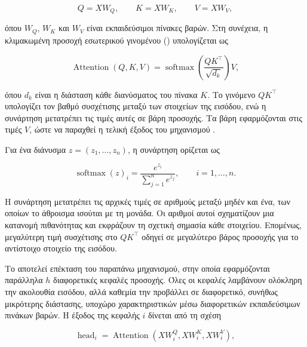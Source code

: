 \begin{equation}
    Q=XW_Q,\qquad K=XW_K,\qquad V=XW_V,
\end{equation}

όπου \(W_Q\), \(W_K\) και \(W_V\) είναι εκπαιδεύσιμοι πίνακες βαρών. Στη
συνέχεια, η κλιμακωμένη προσοχή εσωτερικού γινομένου
() υπολογίζεται ως

\begin{equation}
    \operatorname{Attention}(Q,K,V)
    =
    \operatorname{softmax}
    \left(
        \frac{QK^{\top}}{\sqrt{d_k}}
    \right)V,
    \label{eq:attention}
\end{equation}

όπου \(d_k\) είναι η διάσταση κάθε διανύσματος του πίνακα \(K\). Το γινόμενο
\(QK^{\top}\) υπολογίζει τον βαθμό συσχέτισης μεταξύ των στοιχείων της
εισόδου, ενώ η συνάρτηση  μετατρέπει τις τιμές αυτές σε βάρη
προσοχής. Τα βάρη εφαρμόζονται στις τιμές \(V\), ώστε να παραχθεί η τελική
έξοδος του μηχανισμού \cite{vaswani2017attention}.

Για ένα διάνυσμα \(z=(z_1,\ldots,z_n)\), η συνάρτηση  ορίζεται ως

\begin{equation}
    \operatorname{softmax}(z)_i
    =
    \frac{e^{z_i}}{\sum_{j=1}^{n}e^{z_j}},
    \qquad i=1,\ldots,n.
    \label{eq:softmax}
\end{equation}

Η συνάρτηση  μετατρέπει τις αρχικές τιμές σε αριθμούς μεταξύ
μηδέν και ένα, των οποίων το άθροισμα ισούται με τη μονάδα. Οι αριθμοί αυτοί
σχηματίζουν μια κατανομή πιθανότητας και εκφράζουν τη σχετική σημασία κάθε
στοιχείου. Επομένως, μεγαλύτερη τιμή συσχέτισης στο \(QK^{\top}\) οδηγεί σε
μεγαλύτερο βάρος προσοχής για το αντίστοιχο στοιχείο της εισόδου.

Το  αποτελεί επέκταση του παραπάνω μηχανισμού, στην
οποία εφαρμόζονται παράλληλα \(h\) διαφορετικές κεφαλές προσοχής. Όλες οι
κεφαλές λαμβάνουν ολόκληρη την ακολουθία εισόδου, αλλά καθεμία την προβάλλει
σε διαφορετικό, συνήθως μικρότερης διάστασης, υποχώρο χαρακτηριστικών μέσω
διαφορετικών εκπαιδεύσιμων πινάκων βαρών. Η έξοδος της κεφαλής \(i\) δίνεται
από τη σχέση

\begin{equation}
    \operatorname{head}_i
    =
    \operatorname{Attention}
    \left(XW_i^Q, XW_i^K, XW_i^V\right),
    \label{eq:attention-head}
\end{equation}

